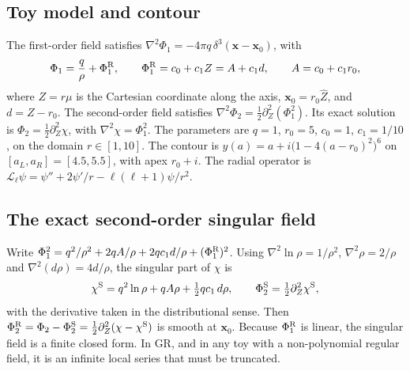 \documentclass[11pt,a4paper]{article}
\newcommand{\Lop}{\mathcal{L}_\ell}
\newcommand{\x}{\mathbf{x}}
\begin{document}
\subsection{Toy model and contour}
The first-order field satisfies $\nabla^2\Phi_1=-4\pi q\,\delta^3(\x-\x_0)$, with
\begin{equation}
\Phi_1=\frac q\rho+\Phi^{\rm R}_1,\qquad \Phi^{\rm R}_1=c_0+c_1Z=A+c_1d,\qquad A=c_0+c_1r_0,
\end{equation}
where $Z=r\mu$ is the Cartesian coordinate along the axis, $\x_0=r_0\hat Z$, and $d=Z-r_0$.
The second-order field satisfies $\nabla^2\Phi_2=\tfrac12\partial_Z^2(\Phi_1^2)$.
Its exact solution is $\Phi_2=\tfrac12\partial_Z^2\chi$, with $\nabla^2\chi=\Phi_1^2$.
The parameters are $q=1$, $r_0=5$, $c_0=1$, $c_1=1/10$, on the domain $r\in[1,10]$.
The contour is $y(a)=a+i\big(1-4(a-r_0)^2\big)^6$ on $[a_L,a_R]=[4.5,5.5]$, with apex $r_0+i$.
The radial operator is $\Lop\psi=\psi''+2\psi'/r-\ell(\ell+1)\psi/r^2$.

\subsection{The exact second-order singular field}
Write $\Phi_1^2=q^2/\rho^2+2qA/\rho+2qc_1d/\rho+(\Phi_1^{\rm R})^2$.
Using $\nabla^2\ln\rho=1/\rho^2$, $\nabla^2\rho=2/\rho$ and $\nabla^2(d\rho)=4d/\rho$, the singular part of $\chi$ is
\begin{equation}
\chi^{\rm S}=q^2\ln\rho+qA\rho+\tfrac12qc_1\,d\rho,\qquad
\Phi_2^{\rm S}=\tfrac12\partial_Z^2\chi^{\rm S},
\label{eq:PhiS}
\end{equation}
with the derivative taken in the distributional sense.
Then $\Phi_2^{\rm R}=\Phi_2-\Phi_2^{\rm S}=\tfrac12\partial_Z^2(\chi-\chi^{\rm S})$ is smooth at $\x_0$.
Because $\Phi_1^{\rm R}$ is linear, the singular field is a finite closed form.
In GR, and in any toy with a non-polynomial regular field, it is an infinite local series that must be truncated.
\end{document}
